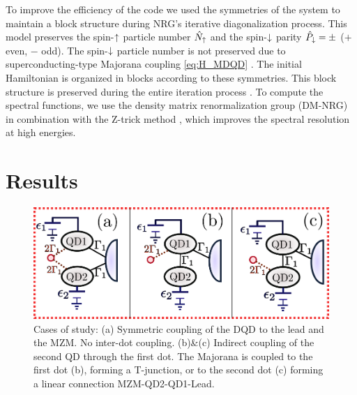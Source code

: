 \documentclass[showpacs,aps,prb,reprint,superscriptaddress]{revtex4-1}
\begin{document}


To  improve the efficiency of the code we used the symmetries of the system to maintain a block structure during NRG's iterative diagonalization process. This model preserves the spin-$\uparrow$ particle number $\hat{N}_\uparrow$ and the spin-$\downarrow$ parity $\hat{P}_\downarrow = \pm $ ($+$ even, $-$ odd). The spin-$\downarrow$ particle number is not preserved due to superconducting-type Majorana coupling  \eqref{eq:H_MDQD} . The initial Hamiltonian is organized in blocks according to these symmetries. This block structure is preserved during the entire iteration process \cite{bulla_numerical_2008}. To compute the spectral functions, we use the density matrix renormalization group (DM-NRG)  \cite{hofstetter_generalized_2000} in combination with the Z-trick method \cite{oliveira_generalized_1994}, which improves the spectral resolution at high energies.
  
 \section{Results \label{sec:results}}
\begin{figure}[h]
	\begin{center}
	\includegraphics[scale=0.5]{Graficos/MajoranaModels.png}
	\caption{\label{fig:MajoranaModels}  Cases of study: (a) Symmetric coupling of the DQD to the lead and the MZM. No inter-dot coupling. (b)\&(c) Indirect coupling of the second QD through the first dot. The Majorana is coupled to the first dot (b), forming a T-junction,  or to the second dot (c) forming a linear connection MZM-QD2-QD1-Lead. 
	}
\end{center}
\end{figure}
\end{document}

